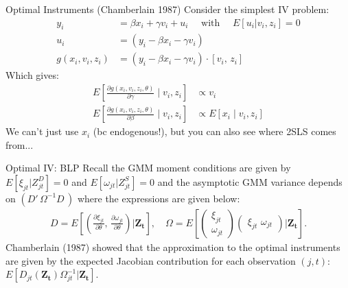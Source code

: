 \documentclass[xcolor=pdftex,dvipsnames,table,mathserif,aspectratio=169]{beamer}
\begin{document}
\begin{frame}{Optimal Instruments (Chamberlain 1987)}
Consider the simplest IV problem:
\begin{align*}
y_i &= \beta x_i + \gamma v_i + u_i \quad \text{ with } \quad E[u_i | v_i, z_i] =0 \\
u_i &= \left(y_i - \beta x_i - \gamma v_i \right) \\
g(x_i,v_i,z_i) &= \left(y_i - \beta x_i - \gamma v_i \right) \cdot [v_i,\, z_i]
 \end{align*}
 Which gives:
\begin{align*}
E\left[\frac{\partial g(x_i,v_i, z_i,\theta)}{\partial \gamma} \mid v_i, z_i \right] &\propto v_i\\
E\left[\frac{\partial g(x_i,v_i, z_i,\theta)}{\partial \beta} \mid v_i, z_i \right] &\propto E\left[x_i \mid v_i, z_i \right]
\end{align*}
We can't just use $x_i$ (bc endogenous!), but you can also see where 2SLS comes from...
\end{frame}



\begin{frame}{Optimal IV: BLP}
Recall the GMM moment conditions are given by $E[\xi_{jt} | Z_{jt}^D]=0$ and $E[\omega_{jt} | Z_{jt}^S]=0$ and the asymptotic GMM variance depends on $(D'\, \Omega^{-1} D\,)$ where the expressions are given below:
\begin{align*}
    D=E\left[
    \left(\frac{\partial \xi_{jt}}{\partial \theta}, \,
    \frac{\partial \omega_{jt}}{\partial \theta} \right)
| \mathbf{Z_t} \right], \quad 
\Omega = E\left[
\begin{pmatrix}
    \xi_{jt} \\
    \omega_{jt}
\end{pmatrix}
\begin{pmatrix}
    \xi_{jt}\, \,
    \omega_{jt}
\end{pmatrix}
| \mathbf{Z_t} \right].
\end{align*}
Chamberlain (1987) showed that the approximation to the optimal instruments are given by the expected Jacobian contribution for each observation $(j,t)$: $E[D_{jt}(\mathbf{Z_t}) \Omega_{jt}^{-1} | \mathbf{Z_t}]$.
\end{frame}
\end{document}
